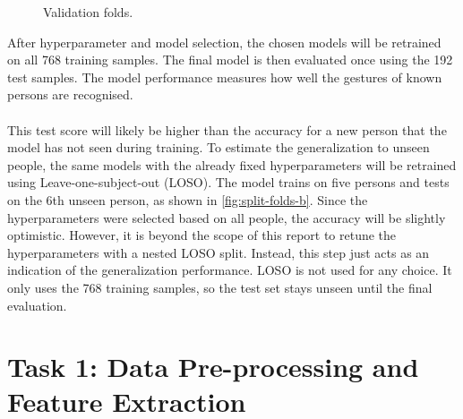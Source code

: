 \documentclass[10pt,a4paper,titlepage]{article}
\newcommand{\placeholder}[1]{\begin{placeholderbox}#1\end{placeholderbox}}
\begin{document}
\begin{figure}[H]
  \medskip
  \caption{Validation folds.}
  \label{fig:split-folds}
\end{figure}
\noindent
After hyperparameter and model selection, the chosen models will be retrained on all 768 training samples. The final model is then evaluated once using the 192 test samples. The model performance measures how well the gestures of known persons are recognised.
\\\\
This test score will likely be higher than the accuracy for a new person that the model has not seen during training. To estimate the generalization to unseen people, the same models with the already fixed hyperparameters will be retrained using Leave-one-subject-out (LOSO). The model trains on five persons and tests on the 6th unseen person, as shown in \autoref{fig:split-folds-b}. Since the hyperparameters were selected based on all people, the accuracy will be slightly optimistic. However, it is beyond the scope of this report to retune the hyperparameters with a nested LOSO split. Instead, this step just acts as an indication of the generalization performance. LOSO is not used for any choice. It only uses the 768 training samples, so the test set stays unseen until the final evaluation.




\section{Task 1: Data Pre-processing and Feature Extraction}
\label{sec:task1}
\end{document}
